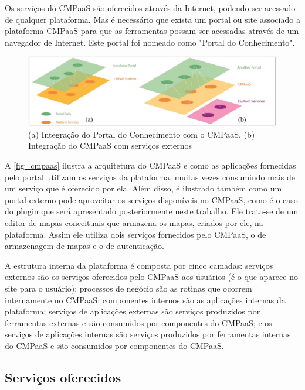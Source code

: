 \documentclass[
	12pt,				%
	openright,			%
	oneside,			%
	a4paper,			%
	english,			%
	french,				%
	spanish,			%
	brazil				%
	]{abntex2}
\begin{document}
Os serviços do CMPaaS são oferecidos através da Internet, podendo ser acessado de qualquer plataforma. Mas é necessário que exista um portal ou site associado a plataforma CMPaaS para que as ferramentas possam ser acessadas através de um navegador de Internet. Este portal foi nomeado como "Portal do Conhecimento"\cite{Perin2014}. 


\begin{figure}[htb]
	\caption{\label{fig_cmpaas}(a) Integração do Portal do Conhecimento com o CMPaaS. (b) Integração do CMPaaS com serviços externos}
	\begin{center}
		\includegraphics[scale=0.3]{cmpaas.png}
	\end{center}
\end{figure}

A \autoref{fig_cmpaas} ilustra a arquitetura do CMPaaS e como as aplicações fornecidas pelo portal utilizam os serviços da plataforma, muitas vezes consumindo mais de um serviço que é oferecido por ela. Além disso, é ilustrado também como um portal externo pode aproveitar os serviços disponíveis no CMPaaS, como é o caso do plugin que será apresentado posteriormente neste trabalho. Ele trata-se de um editor de mapas conceituais que armazena os mapas, criados por ele, na plataforma. Assim ele utiliza dois serviços fornecidos pelo CMPaaS, o de armazenagem de mapas e o de autenticação.

A estrutura interna da plataforma é composta por cinco camadas: serviços externos são os serviços oferecidos pelo CMPaaS aos usuários (é o que aparece no site para o usuário); processos de negócio são as rotinas que ocorrem internamente no CMPaaS; componentes internos são as aplicações internas da plataforma; serviços de aplicações externas são serviços produzidos por ferramentas externas e são consumidos por componentes do CMPaaS; e os serviços de aplicações internas são serviços produzidos por ferramentas internas do CMPaaS e são consumidos por componentes do CMPaaS.

\subsection{Serviços oferecidos}
\end{document}
